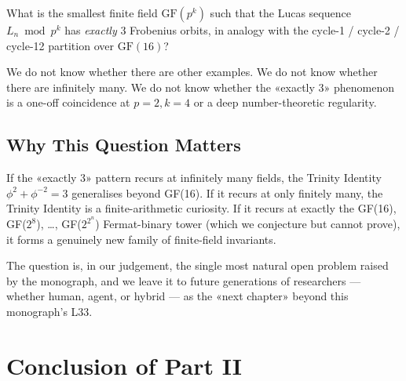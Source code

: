 \begin{question}
\label{q:31-lucas-limit}
What is the smallest finite field $\mathrm{GF}(p^{k})$ such that the Lucas sequence $L_{n} \bmod p^{k}$ has \emph{exactly} 3 Frobenius orbits, in analogy with the cycle-1 / cycle-2 / cycle-12 partition over $\mathrm{GF}(16)$?
\end{question}

We do not know whether there are other examples. We do not know whether there are infinitely many. We do not know whether the «exactly 3» phenomenon is a one-off coincidence at $p=2, k=4$ or a deep number-theoretic regularity.

\subsection{Why This Question Matters}
\label{sec:31-limit-matters}

If the «exactly 3» pattern recurs at infinitely many fields, the Trinity Identity $\phi^{2} + \phi^{-2} = 3$ generalises beyond GF(16). If it recurs at only finitely many, the Trinity Identity is a finite-arithmetic curiosity. If it recurs at exactly the GF(16), GF($2^{8}$), …, GF($2^{2^{n}}$) Fermat-binary tower (which we conjecture but cannot prove), it forms a genuinely new family of finite-field invariants.

The question is, in our judgement, the single most natural open problem raised by the monograph, and we leave it to future generations of researchers — whether human, agent, or hybrid — as the «next chapter» beyond this monograph's L33.

\section{Conclusion of Part II}
\label{sec:31-conclusion-2}

